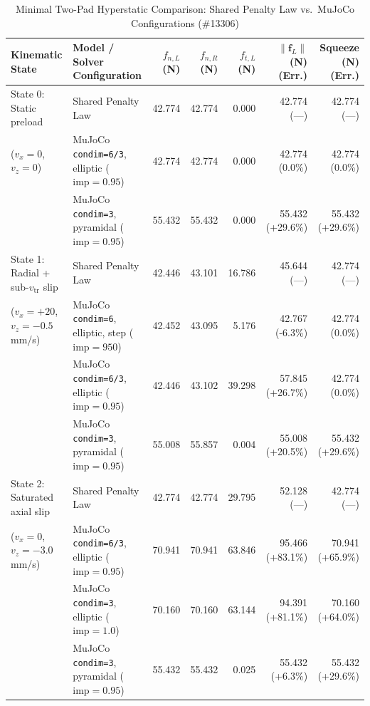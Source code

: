 \documentclass[11pt,a4paper]{article}
\begin{document}
\begin{enumerate}[leftmargin=*,noitemsep]
\end{enumerate}

\begin{table}[h]
\centering
\caption{Minimal Two-Pad Hyperstatic Comparison: Shared Penalty Law vs.\ MuJoCo Configurations (\#13306)}
\label{tab:mujoco-two-pad-hyperstatic}
\scriptsize
\begin{tabular}{@{}llrrrrr@{}}
\toprule
Kinematic State & Model / Solver Configuration & $f_{n,L}$ (N) & $f_{n,R}$ (N) & $f_{t,L}$ (N) & $\|\mathbf{f}_L\|$ (N) (Err.) & Squeeze (N) (Err.) \\
\midrule
State 0: Static preload & Shared Penalty Law & 42.774 & 42.774 & 0.000 & 42.774 (---) & 42.774 (---) \\
($v_x = 0$, $v_z = 0$) & MuJoCo \texttt{condim=6/3}, elliptic ($\mathrm{imp}=0.95$) & 42.774 & 42.774 & 0.000 & 42.774 (0.0\%) & 42.774 (0.0\%) \\
 & MuJoCo \texttt{condim=3}, pyramidal ($\mathrm{imp}=0.95$) & 55.432 & 55.432 & 0.000 & 55.432 (+29.6\%) & 55.432 (+29.6\%) \\
\midrule
State 1: Radial + sub-$v_{\mathrm{tr}}$ slip & Shared Penalty Law & 42.446 & 43.101 & 16.786 & 45.644 (---) & 42.774 (---) \\
($v_x = +20$, $v_z = -0.5$\,mm/s) & MuJoCo \texttt{condim=6}, elliptic, step ($\mathrm{imp}=950$) & 42.452 & 43.095 & 5.176 & 42.767 (-6.3\%) & 42.774 (0.0\%) \\
 & MuJoCo \texttt{condim=6/3}, elliptic ($\mathrm{imp}=0.95$) & 42.446 & 43.102 & 39.298 & 57.845 (+26.7\%) & 42.774 (0.0\%) \\
 & MuJoCo \texttt{condim=3}, pyramidal ($\mathrm{imp}=0.95$) & 55.008 & 55.857 & 0.004 & 55.008 (+20.5\%) & 55.432 (+29.6\%) \\
\midrule
State 2: Saturated axial slip & Shared Penalty Law & 42.774 & 42.774 & 29.795 & 52.128 (---) & 42.774 (---) \\
($v_x = 0$, $v_z = -3.0$\,mm/s) & MuJoCo \texttt{condim=6/3}, elliptic ($\mathrm{imp}=0.95$) & 70.941 & 70.941 & 63.846 & 95.466 (+83.1\%) & 70.941 (+65.9\%) \\
 & MuJoCo \texttt{condim=3}, elliptic ($\mathrm{imp}=1.0$) & 70.160 & 70.160 & 63.144 & 94.391 (+81.1\%) & 70.160 (+64.0\%) \\
 & MuJoCo \texttt{condim=3}, pyramidal ($\mathrm{imp}=0.95$) & 55.432 & 55.432 & 0.025 & 55.432 (+6.3\%) & 55.432 (+29.6\%) \\
\bottomrule
\end{tabular}
\end{table}
\end{document}
